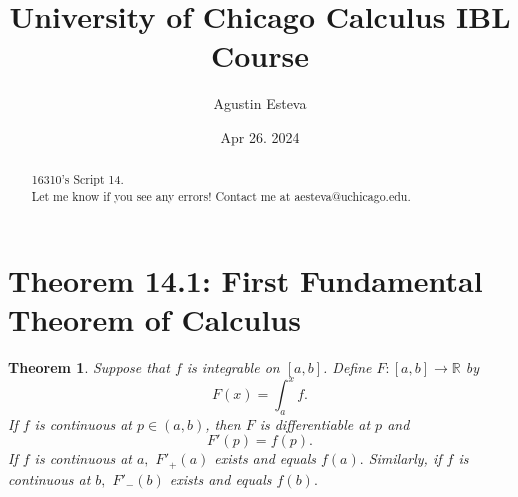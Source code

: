 \documentclass[openany, amssymb, psamsfonts]{amsart}
\title{University of Chicago Calculus IBL Course}
\author{Agustin Esteva}
\date{Apr 26. 2024}
\newcommand{\bbR}{\mathbb{R}}
\newtheorem{thm}{Theorem}[section]
\theoremstyle{definition}
\numberwithin{equation}{section}
\begin{document}
\begin{abstract}

16310's Script 14.\\ Let me know if you see any errors! Contact me at aesteva@uchicago.edu.


\end{abstract}

\maketitle

\tableofcontents

\setcounter{section}{14}
\section*{Theorem 14.1: First Fundamental Theorem of Calculus}
\begin{thm} 
\label{14.1}
	Suppose that $f$ is integrable on $[a, b]$. Define $F\colon [a, b] \to \bbR$ by
	\[
		F(x) = \int_{a}^{x} f.
	\]
	If $f$ is continuous at $p \in (a, b)$, then $F$ is differentiable at $p$ and
	\[
		F'(p) = f(p).
	\]
	If $f$ is continuous at $a,$ $F'_{+}(a)$ exists and equals $f(a).$ Similarly, if $f$ is continuous at $b,$ $F'_{-}(b)$ exists and equals $f(b).$ 
\end{thm}
\end{document}

